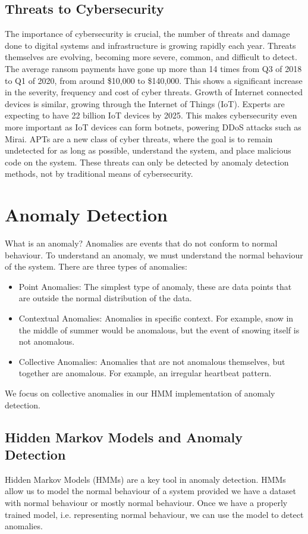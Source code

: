 \documentclass[11pt]{article}
\begin{document}
  \subsection{Threats to Cybersecurity} 
  The importance of cybersecurity is crucial, the number of threats and damage 
  done to digital systems and infrastructure is growing rapidly each year. 
  Threats themselves are evolving, becoming more severe, common, and difficult to 
  detect.
  The average ransom payments have gone up more than 14 times from Q3 of 2018 to
  Q1 of 2020, from around \$10,000 to \$140,000.
  This shows a significant increase in the severity, frequency and cost of cyber 
  threats.
  Growth of Internet connected devices is similar, growing through the Internet of 
  Things (IoT). 
  Experts are expecting to have 22 billion IoT devices by 2025.
  This makes cybersecurity even more important as IoT devices can form botnets, 
  powering DDoS attacks such as Mirai. 
  APTs are a new class of cyber threats, where the goal is to remain undetected
  for as long as possible, understand the system, and place malicious code on the 
  system.
  These threats can only be detected by anomaly detection methods, not by 
  traditional means of cybersecurity.


\section{Anomaly Detection}
What is an anomaly? Anomalies are events that do not conform to normal behaviour. 
To understand an anomaly, we must understand the normal behaviour of the system.  
There are three types of anomalies: 
  \begin{itemize}
    \item Point Anomalies: The simplest type of anomaly, these are data points that 
    are outside the normal distribution of the data.
    \item Contextual Anomalies: Anomalies in specific context. For example, snow 
    in the middle of summer would be anomalous, but the event of snowing itself 
    is not anomalous.
    \item Collective Anomalies: Anomalies that are not anomalous themselves, but 
    together are anomalous. For example, an irregular heartbeat pattern.
  \end{itemize}

  We focus on collective anomalies in our HMM implementation of anomaly detection.

  \subsection{Hidden Markov Models and Anomaly Detection}
  Hidden Markov Models (HMMs) are a key tool in anomaly detection.
  HMMs allow us to model the normal behaviour of a system provided we have a 
  dataset with normal behaviour or mostly normal behaviour. 
  Once we have a properly trained model, i.e. representing normal behaviour, we 
  can use the model to detect anomalies. 
\end{document}
